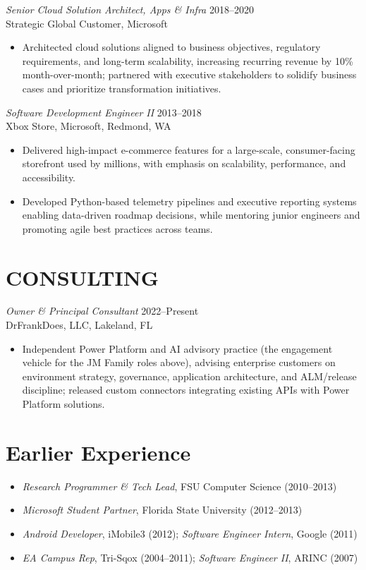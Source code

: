 \documentclass[margin]{res}
\begin{document}
\begin{resume}
{\sl Senior Cloud Solution Architect, Apps \& Infra} \hfill 2018--2020\\
Strategic Global Customer, Microsoft
\begin{itemize}
\item Architected cloud solutions aligned to business objectives, regulatory requirements, and long-term scalability, increasing recurring revenue by 10\% month-over-month; partnered with executive stakeholders to solidify business cases and prioritize transformation initiatives.
\end{itemize}

{\sl Software Development Engineer II} \hfill 2013--2018\\
Xbox Store, Microsoft, Redmond, WA
\begin{itemize}
\item Delivered high-impact e-commerce features for a large-scale, consumer-facing storefront used by millions, with emphasis on scalability, performance, and accessibility.
\item Developed Python-based telemetry pipelines and executive reporting systems enabling data-driven roadmap decisions, while mentoring junior engineers and promoting agile best practices across teams.
\end{itemize}

\section{CONSULTING}
{\sl Owner \& Principal Consultant} \hfill 2022--Present\\
DrFrankDoes, LLC, Lakeland, FL
\begin{itemize}
\item Independent Power Platform and AI advisory practice (the engagement vehicle for the JM Family roles above), advising enterprise customers on environment strategy, governance, application architecture, and ALM/release discipline; released custom connectors integrating existing APIs with Power Platform solutions.
\end{itemize}

\section{Earlier Experience}
\begin{itemize}[itemsep=-2pt]
  \item \textit{Research Programmer \& Tech Lead}, FSU Computer Science (2010–2013)
  \item \textit{Microsoft Student Partner}, Florida State University (2012–2013)
  \item \textit{Android Developer}, iMobile3 (2012); \textit{Software Engineer Intern}, Google (2011)
  \item \textit{EA Campus Rep}, Tri-Sqox (2004–2011); \textit{Software Engineer II}, ARINC (2007)
\end{itemize}


\end{resume}
\end{document}
